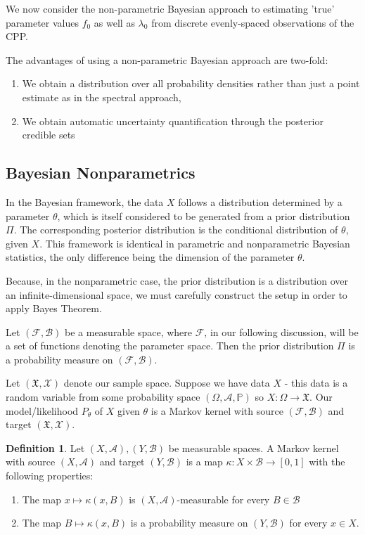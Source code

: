 \documentclass[a4paper,11pt]{article}
\theoremstyle{theorem}
\theoremstyle{definition}
\newtheorem{defn}{Definition}[section]
\theoremstyle{remark}
\begin{document}
We now consider the non-parametric Bayesian approach to estimating 'true' parameter values $f_{0}$ as well as $\lambda_{0}$ from discrete evenly-spaced observations of the CPP.

The advantages of using a non-parametric Bayesian approach are two-fold:
\begin{enumerate}
\item We obtain a distribution over all probability densities rather than just a point estimate as in the spectral approach,
\item We obtain automatic uncertainty quantification through the posterior credible sets
\end{enumerate}

\subsection{Bayesian Nonparametrics}

In the Bayesian framework, the data $X$ follows a distribution determined by a parameter $\theta$, which is itself considered to be generated from a prior distribution $\Pi$. The corresponding posterior distribution is the conditional distribution of $\theta$, given $X$. This framework is identical in parametric and nonparametric Bayesian statistics, the only difference being the dimension of the parameter $\theta$.

Because, in the nonparametric case, the prior distribution is a distribution over an infinite-dimensional space, we must carefully construct the setup in order to apply Bayes Theorem.

Let $(\mathcal{F}, \mathcal{B})$ be a measurable space, where $\mathcal{F}$, in our following discussion, will be a set of functions denoting the parameter space. Then the prior distribution $\Pi$ is a probability measure on $(\mathcal{F}, \mathcal{B})$.

Let $(\mathfrak{X}, \mathcal{X})$ denote our sample space. Suppose we have data $X$ - this data is a random variable from some probability space $(\Omega, \mathcal{A}, \mathbb{P})$ so $X: \Omega \to \mathfrak{X}$. Our model/likelihood $P_{\theta}$ of $X$ given $\theta$ is a Markov kernel with source $(\mathcal{F}, \mathcal{B})$ and target $(\mathfrak{X}, \mathcal{X})$. 

\begin{defn}
Let $(X, \mathcal{A}), (Y, \mathcal{B})$ be measurable spaces. A Markov kernel with source $(X, \mathcal{A})$ and target $(Y, \mathcal{B})$ is a map $\kappa : X \times \mathcal{B} \to [0, 1]$ with the following properties:
\begin{enumerate}
\item The map $x \mapsto \kappa(x, B)$ is $(X, \mathcal{A})$-measurable for every $B \in \mathcal{B}$
\item The map $B \mapsto \kappa(x, B)$ is a probability measure on $(Y, \mathcal{B})$ for every $x \in X$.
\end{enumerate} 
\end{defn}
\end{document}
